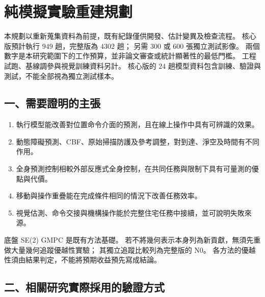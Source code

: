 
\section*{純模擬實驗重建規劃}

本規劃以重新蒐集資料為前提，既有紀錄僅供開發、估計變異及檢查流程。
核心版預計執行 $949$ 趟，完整版為 $4302$ 趟；
另需 $300$ 或 $600$ 張獨立測試影像。
兩個數字是本研究範圍下的工作預算，並非論文審查或統計顯著性的最低門檻。
工程試跑、基線調參與視覺訓練資料另計。
核心版的 $24$ 趟模型資料包含訓練、驗證與測試，不能全部視為獨立測試樣本。

\subsection*{一、需要證明的主張}

\begin{enumerate}
    \item 執行模型能改善對位置命令介面的預測，且在線上操作中具有可辨識的效果。
    \item 動態障礙預測、CBF、原始掃描防護及參考調整，對到達、淨空及時間有不同作用。
    \item 全身預測控制相較外部反應式全身控制，在共同任務與限制下具有可量測的優點與代價。
    \item 移動與操作重疊能在完成條件相同的情況下改善任務效率。
    \item 視覺估測、命令交接與機構操作能於完整住宅任務中接續，並可說明失敗來源。
\end{enumerate}

底盤 SE(2) GMPC 是既有方法基礎。
若不將幾何表示本身列為新貢獻，無須先重做大量幾何追蹤優越性實驗；
其獨立追蹤比較列為完整版的 N0。
各方法的優越性須由結果判定，不能將預期收益預先寫成結論。

\subsection*{二、相關研究實際採用的驗證方式}

